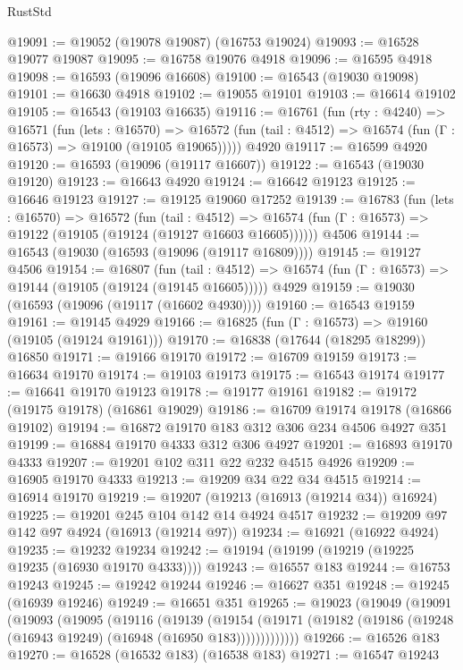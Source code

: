 \begin{lexlean}{RustStd}
\begin{coremodule}
@19091 := @19052 (@19078 @19087) (@16753 @19024)
@19093 := @16528 @19077 @19087
@19095 := @16758 @19076 @4918
@19096 := @16595 @4918
@19098 := @16593 (@19096 @16608)
@19100 := @16543 (@19030 @19098)
@19101 := @16630 @4918
@19102 := @19055 @19101
@19103 := @16614 @19102
@19105 := @16543 (@19103 @16635)
@19116 := @16761
    (fun (rty : @4240) =>
    @16571
      (fun (lets : @16570) =>
      @16572 (fun (tail : @4512) => @16574 (fun (Γ : @16573) => @19100 (@19105 @19065)))))
    @4920
@19117 := @16599 @4920
@19120 := @16593 (@19096 (@19117 @16607))
@19122 := @16543 (@19030 @19120)
@19123 := @16643 @4920
@19124 := @16642 @19123
@19125 := @16646 @19123
@19127 := @19125 @19060 @17252
@19139 := @16783
    (fun (lets : @16570) =>
    @16572
      (fun (tail : @4512) =>
      @16574 (fun (Γ : @16573) => @19122 (@19105 (@19124 (@19127 @16603 @16605))))))
    @4506
@19144 := @16543 (@19030 (@16593 (@19096 (@19117 @16809))))
@19145 := @19127 @4506
@19154 := @16807
    (fun (tail : @4512) => @16574 (fun (Γ : @16573) => @19144 (@19105 (@19124 (@19145 @16605)))))
    @4929
@19159 := @19030 (@16593 (@19096 (@19117 (@16602 @4930))))
@19160 := @16543 @19159
@19161 := @19145 @4929
@19166 := @16825 (fun (Γ : @16573) => @19160 (@19105 (@19124 @19161)))
@19170 := @16838 (@17644 (@18295 @18299)) @16850
@19171 := @19166 @19170
@19172 := @16709 @19159
@19173 := @16634 @19170
@19174 := @19103 @19173
@19175 := @16543 @19174
@19177 := @16641 @19170 @19123
@19178 := @19177 @19161
@19182 := @19172 (@19175 @19178) (@16861 @19029)
@19186 := @16709 @19174 @19178 (@16866 @19102)
@19194 := @16872 @19170 @183 @312 @306 @234 @4506 @4927 @351
@19199 := @16884 @19170 @4333 @312 @306 @4927
@19201 := @16893 @19170 @4333
@19207 := @19201 @102 @311 @22 @232 @4515 @4926
@19209 := @16905 @19170 @4333
@19213 := @19209 @34 @22 @34 @4515
@19214 := @16914 @19170
@19219 := @19207 (@19213 (@16913 (@19214 @34)) @16924)
@19225 := @19201 @245 @104 @142 @14 @4924 @4517
@19232 := @19209 @97 @142 @97 @4924 (@16913 (@19214 @97))
@19234 := @16921 (@16922 @4924)
@19235 := @19232 @19234
@19242 := @19194 (@19199 (@19219 (@19225 @19235 (@16930 @19170 @4333))))
@19243 := @16557 @183
@19244 := @16753 @19243
@19245 := @19242 @19244
@19246 := @16627 @351
@19248 := @19245 (@16939 @19246)
@19249 := @16651 @351
@19265 := @19023
    (@19049
      (@19091
        (@19093
          (@19095
            (@19116
              (@19139
                (@19154
                  (@19171 (@19182 (@19186 (@19248 (@16943 @19249) (@16948 (@16950 @183)))))))))))))
@19266 := @16526 @183
@19270 := @16528 (@16532 @183) (@16538 @183)
@19271 := @16547 @19243

\end{coremodule}
\end{lexlean}
